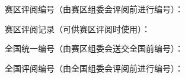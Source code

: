 {%
\par\vfill
赛区评阅编号（由赛区组委会评阅前进行编号）：\par\vfill\vfill

赛区评阅记录（可供赛区评阅时使用）：\vspace{1\ccwd}

\begin{center}
\end{center}\vspace{1\ccwd}

全国统一编号（由赛区组委会送交全国前编号）：\par\vfill\vfill

全国评阅编号（由全国组委会评阅前进行编号）：\par\vfill\vfill\vfill
}
\renewcommand{\baselinestretch}{1.3}\normalsize

\newpage